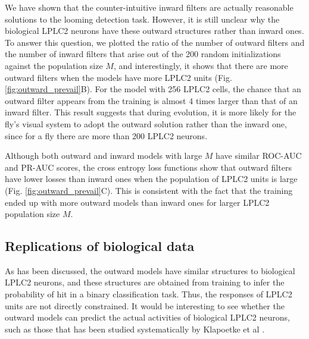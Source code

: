 \documentclass[9pt,lineno]{elife}
\begin{document}
We have shown that the counter-intuitive inward filters are actually reasonable solutions to the looming detection task. However, it is still unclear why the biological LPLC2 neurons have these outward structures rather than inward ones. To answer this question, we plotted the ratio of the number of outward filters and the number of inward filters that arise out of the 200 random initializations against the population size $M$, and interestingly, it shows that there are more outward filters when the models have more LPLC2 units (Fig. \ref{fig:outward_prevail}B). For the model with 256 LPLC2 cells, the chance that an outward filter appears from the training is almost 4 times larger than that of an inward filter. This result suggests that during evolution, it is more likely for the fly's visual system to adopt the outward solution rather than the inward one, since for a fly there are more than 200 LPLC2 neurons. 

Although both outward and inward models with large $M$ have similar ROC-AUC and PR-AUC scores,  the cross entropy loss functions show that outward filters have lower losses than inward ones when the population of LPLC2 units is large (Fig. \ref{fig:outward_prevail}C). This is consistent with the fact that the training ended up with more outward models than inward ones for larger LPLC2 population size $M$.


\subsection{Replications of biological data}




As has been discussed, the outward models have similar structures to biological LPLC2 neurons, and these structures are obtained from training to infer the probability of hit in a binary classification task. Thus, the responses of LPLC2 units are not directly constrained. It would be interesting to see whether the outward models can predict the actual activities of biological LPLC2 neurons, such as those that has been studied systematically by Klapoetke et al \cite{klapoetke2017ultra}. 
\end{document}

